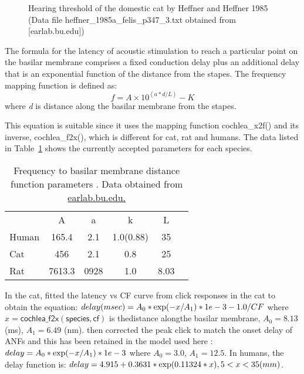 \begin{appendix}
\medskip{}

\begin{figure}[htb]
\begin{center}
\caption{Hearing threshold of the domestic cat by Heffner and Heffner
  1985 \citep{HeffnerHeffner:1985} (Data file
  \mbox{heffner\_1985a\_felis\_p347\_3.txt} obtained from [earlab.bu.edu])}
\label{fig:AudThresholdRat}
\end{center}
\end{figure}


The formula for the latency of acoustic stimulation to reach a
particular point on the basilar membrane comprises a fixed conduction
delay plus an additional delay that is an exponential function of the
distance from the stapes. The frequency mapping function is defined
as:
\[
 f = A\times10^{\left(a*d/L\right)} - K
 \]
where \emph{d} is distance along the basilar membrane from the stapes.

\medskip{}

This equation is suitable since it uses the mapping function
\mbox{\textsf{cochlea\_x2f()}} and its inverse, \mbox{\textsf{cochlea\_f2x()}}, which is
different for cat, rat and humans.  The data listed in
Table~\ref{tab:f2x} shows the currently accepted parameters for each
species.


\begin{table}[h]
  \centering
  \begin{tabular}{lccccc}
    \hline
& A & a & k & L \\
Human &165.4	&2.1	&1.0(0.88)	&35     \\
Cat&456&	2.1&0.8&25 \\
Rat&7613.3	&0928	&1.0&	8.03     \\
    \hline
  \end{tabular}
  \caption{Frequency to basilar membrane distance function parameters \citep{FitzGeraldBurkittEtAl:2001}. Data obtained from \url{earlab.bu.edu.}}\label{tab:f2x}
\end{table}


In the cat, \citet{CarneyYin:1988} fitted the latency vs CF curve from
click responses in the cat to obtain the equation: \( delay (msec) =
A_0 * {\rm exp}( -x / A_1 ) * 1e-3 - 1.0/CF \) where $x = \mathsf{cochlea\_f2x(species, cf)}$ is thedistance alongthe basilar membrane, $A_0 = 8.13$ (ms), $A_1 = 6.49$
(nm). \citet{HeinzZhangEtAl:2001} then corrected the peak click to
match the onset delay of ANFs and this has been retained in the model
used here \citep{ZilanyBruceEtAl:2009}: \(delay = A_0 * {\rm exp}(-x / A_1) * 1e-3
\) where $A_0 = 3.0$, $A_1 = 12.5$. In
humans, the delay function is: \( delay = 4.915 +
0.3631 * {\rm exp}(0.11324*x) , 5<x<35 (mm) \).


\end{appendix}
